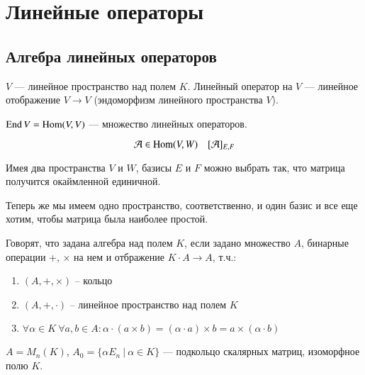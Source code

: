 \documentclass[main]{subfiles}
\begin{document}
\part{Линейные операторы}

\chapter{Алгебра линейных операторов} 

\begin{definition} 
    $V$ — линейное пространство над полем $K$.
    Линейный оператор на $V$ — линейное отображение $V \to V$ (эндоморфизм линейного пространства $V$).
\end{definition}
\begin{definition} 
    $\operatorname{End} V = \operatorname{Hom}(V, V)$ —  множество линейных операторов.
\end{definition}

\[\mathcal{A} \in \operatorname{Hom} (V, W) \quad [\mathcal{A}]_{E,F}\]

Имея два пространства $V$ и $W$, базисы $E$ и $F$ можно выбрать так, что матрица получится окаймленной единичной.

Теперь же мы имеем одно пространство, соответственно, и один базис и все еще хотим, чтобы матрица была наиболее простой.

\begin{definition} [Алгебра]
    Говорят, что задана алгебра над полем $K$, если задано множество $A$, бинарные операции +, $\times$ на нем и отбражение $K \cdot A \to A$, т.ч.:
    \begin{enumerate}
        \item $(A,+, \times)$ -- кольцо
        \item $(A,+, \cdot)$ -- линейное пространство над полем $K$
        \item $\forall \alpha \in K \  \forall a, b \in A : \alpha \cdot (a \times b) = (\alpha \cdot a) \times b = a \times (\alpha \cdot b)$
    \end{enumerate}
\end{definition}

\begin{example}
    $A = M_n(K)$,
    $A_0 = \{ \alpha E_n \ | \ \alpha \in K\}$ —  подкольцо скалярных матриц, изоморфное полю $K$.
\end{example}
\end{document}
